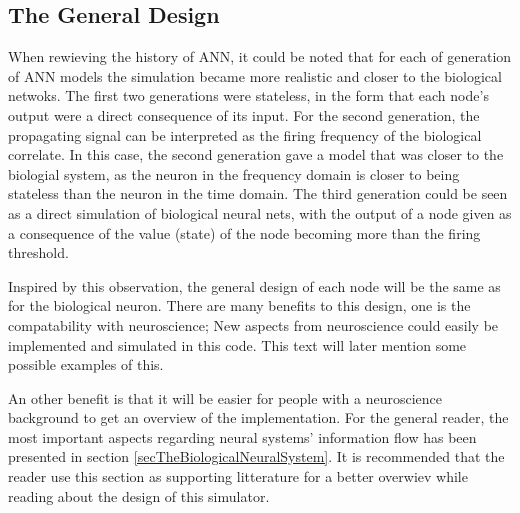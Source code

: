 	\subsection{The General Design}
	\label{ssecTheGeneralDesign}
		When rewieving the history of ANN, it could be noted that for each of generation of ANN models the simulation became more realistic and closer to the biological netwoks.
		The first two generations were stateless, in the form that each node's output were a direct consequence of its input.
		For the second generation, the propagating signal can be interpreted as the firing frequency of the biological correlate.
		In this case, the second generation gave a model that was closer to the biologial system, as the neuron in the frequency domain is closer to being stateless than the neuron in the time domain.
		The third generation could be seen as a direct simulation of biological neural nets, with the output of a node given as a consequence of the value (state) of the node becoming more than the firing threshold.
	
		Inspired by this observation, the general design of each node will %
			be the same as for the biological neuron.
		There are many benefits to this design, one is the compatability with neuroscience;
			New aspects from neuroscience could easily be implemented and simulated in this code.
		This text will later mention some possible examples of this. %

		An other benefit is that it will be easier for people with a neuroscience background to get an overview of the implementation.
		For the general reader, the most important aspects regarding neural systems' information flow has been presented in section \ref{secTheBiologicalNeuralSystem}. %
		It is recommended that the reader use this section as supporting litterature for a better overwiev while reading about the design of this simulator.

